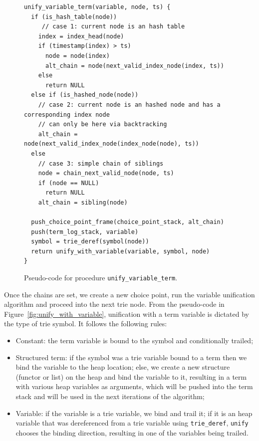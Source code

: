 \begin{figure}[ht]
\begin{Verbatim}
unify_variable_term(variable, node, ts) {
  if (is_hash_table(node))
     // case 1: current node is an hash table
    index = index_head(node)
    if (timestamp(index) > ts)
      node = node(index)
      alt_chain = node(next_valid_index_node(index, ts))
    else
      return NULL
  else if (is_hashed_node(node))
    // case 2: current node is an hashed node and has a corresponding index node
    // can only be here via backtracking
    alt_chain = node(next_valid_index_node(index_node(node), ts))
  else
    // case 3: simple chain of siblings
    node = chain_next_valid_node(node, ts)
    if (node == NULL)
      return NULL
    alt_chain = sibling(node)
  
  push_choice_point_frame(choice_point_stack, alt_chain)
  push(term_log_stack, variable)
  symbol = trie_deref(symbol(node))
  return unify_with_variable(variable, symbol, node)
}
\end{Verbatim}
\caption{Pseudo-code for procedure \texttt{unify\_variable\_term}.}
\label{fig:unify_variable_term}
\end{figure}

\begin{samepage}

Once the chains are set, we create a new choice point, run the variable unification algorithm
and proceed into the next trie node.
From the pseudo-code in Figure~\ref{fig:unify_with_variable}, unification with a term variable
is dictated by the type of trie symbol. It follows the following rules:

\begin{itemize}
  \item Constant: the term variable is bound to the symbol and conditionally trailed;
  \item Structured term: if the symbol was a trie variable bound to a term then we bind
  the variable to the heap location; else, we create a new structure (functor or list) on the heap and bind
  the variable to it, resulting in a term with various heap variables as arguments, which will be pushed into
  the term stack and will be used in the next iterations of the algorithm;
  \item Variable: if the variable is a trie variable, we bind and trail it; if it is an heap variable that
  was dereferenced from a trie variable using \texttt{trie\_deref}, \texttt{unify} chooses the binding direction,
  resulting in one of the variables being trailed.
\end{itemize}
\end{samepage}


